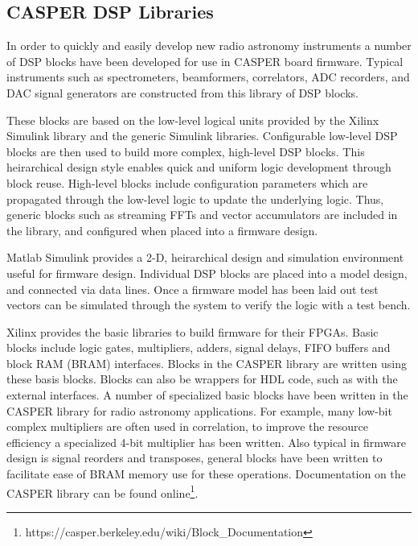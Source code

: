 \documentclass{ws-jai}
\begin{document}

\subsection{CASPER DSP Libraries}
\label{sec:dsp-libraries}



In order to quickly and easily develop new radio astronomy instruments a number
of DSP blocks have been developed for use in CASPER board firmware. Typical
instruments such as spectrometers, beamformers, correlators, ADC recorders, and
DAC signal generators are constructed from this library of DSP blocks.

These blocks are based on the low-level logical units provided by the Xilinx
Simulink library and the generic Simulink libraries. Configurable low-level DSP
blocks are then used to build more complex, high-level DSP blocks. This
heirarchical design style enables quick and uniform logic development through
block reuse. High-level blocks include configuration parameters which are
propagated through the low-level logic to update the underlying logic. Thus,
generic blocks such as streaming FFTs and vector accumulators are included in
the library, and configured when placed into a firmware design.

Matlab Simulink provides a 2-D, heirarchical design and simulation environment
useful for firmware design. Individual DSP blocks are placed into a model
design, and connected via data lines. Once a firmware model has been laid out
test vectors can be simulated through the system to verify the logic with a test
bench.

Xilinx provides the basic libraries to build firmware for their FPGAs. Basic
blocks include logic gates, multipliers, adders, signal delays, FIFO buffers and
block RAM (BRAM) interfaces. Blocks in the CASPER library are written using
these basis blocks. Blocks can also be wrappers for HDL code, such as with the
external interfaces. A number of specialized basic blocks have been written in
the CASPER library for radio astronomy applications. For example, many low-bit
complex multipliers are often used in correlation, to improve the resource
efficiency a specialized 4-bit multiplier has been written. Also typical in
firmware design is signal reorders and transposes, general blocks have been
written to facilitate ease of BRAM memory use for these operations.
Documentation on the CASPER library can be found
online\footnote{https://casper.berkeley.edu/wiki/Block\_Documentation}.
\end{document}
